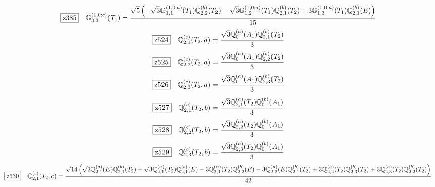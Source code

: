 \documentclass[fleqn,10pt,landscape]{jsarticle}
\begin{document}
\begin{dmath*}
\hspace*{3mm}\fbox{z385}\quad \mathbb{G}_{3,3}^{(1,0;c)}(T_{1})=\frac{\sqrt{5} \left(- \sqrt{3} \mathbb{G}_{1,1}^{(1,0;a)}(T_{1}) \mathbb{Q}_{2,2}^{(b)}(T_{2}) - \sqrt{3} \mathbb{G}_{1,2}^{(1,0;a)}(T_{1}) \mathbb{Q}_{2,1}^{(b)}(T_{2}) + 3 \mathbb{G}_{1,3}^{(1,0;a)}(T_{1}) \mathbb{Q}_{2,1}^{(b)}(E)\right)}{15}
\end{dmath*}
\begin{dmath*}
\hspace*{3mm}\fbox{z524}\quad \mathbb{Q}_{2,1}^{(c)}(T_{2},a)=\frac{\sqrt{3} \mathbb{Q}_{0}^{(a)}(A_{1}) \mathbb{Q}_{2,1}^{(b)}(T_{2})}{3}
\end{dmath*}
\begin{dmath*}
\hspace*{3mm}\fbox{z525}\quad \mathbb{Q}_{2,2}^{(c)}(T_{2},a)=\frac{\sqrt{3} \mathbb{Q}_{0}^{(a)}(A_{1}) \mathbb{Q}_{2,2}^{(b)}(T_{2})}{3}
\end{dmath*}
\begin{dmath*}
\hspace*{3mm}\fbox{z526}\quad \mathbb{Q}_{2,3}^{(c)}(T_{2},a)=\frac{\sqrt{3} \mathbb{Q}_{0}^{(a)}(A_{1}) \mathbb{Q}_{2,3}^{(b)}(T_{2})}{3}
\end{dmath*}
\begin{dmath*}
\hspace*{3mm}\fbox{z527}\quad \mathbb{Q}_{2,1}^{(c)}(T_{2},b)=\frac{\sqrt{3} \mathbb{Q}_{2,1}^{(a)}(T_{2}) \mathbb{Q}_{0}^{(b)}(A_{1})}{3}
\end{dmath*}
\begin{dmath*}
\hspace*{3mm}\fbox{z528}\quad \mathbb{Q}_{2,2}^{(c)}(T_{2},b)=\frac{\sqrt{3} \mathbb{Q}_{2,2}^{(a)}(T_{2}) \mathbb{Q}_{0}^{(b)}(A_{1})}{3}
\end{dmath*}
\begin{dmath*}
\hspace*{3mm}\fbox{z529}\quad \mathbb{Q}_{2,3}^{(c)}(T_{2},b)=\frac{\sqrt{3} \mathbb{Q}_{2,3}^{(a)}(T_{2}) \mathbb{Q}_{0}^{(b)}(A_{1})}{3}
\end{dmath*}
\begin{dmath*}
\hspace*{3mm}\fbox{z530}\quad \mathbb{Q}_{2,1}^{(c)}(T_{2},c)=\frac{\sqrt{14} \left(\sqrt{3} \mathbb{Q}_{2,1}^{(a)}(E) \mathbb{Q}_{2,1}^{(b)}(T_{2}) + \sqrt{3} \mathbb{Q}_{2,1}^{(a)}(T_{2}) \mathbb{Q}_{2,1}^{(b)}(E) - 3 \mathbb{Q}_{2,1}^{(a)}(T_{2}) \mathbb{Q}_{2,2}^{(b)}(E) - 3 \mathbb{Q}_{2,2}^{(a)}(E) \mathbb{Q}_{2,1}^{(b)}(T_{2}) + 3 \mathbb{Q}_{2,2}^{(a)}(T_{2}) \mathbb{Q}_{2,3}^{(b)}(T_{2}) + 3 \mathbb{Q}_{2,3}^{(a)}(T_{2}) \mathbb{Q}_{2,2}^{(b)}(T_{2})\right)}{42}
\end{dmath*}
\end{document}
